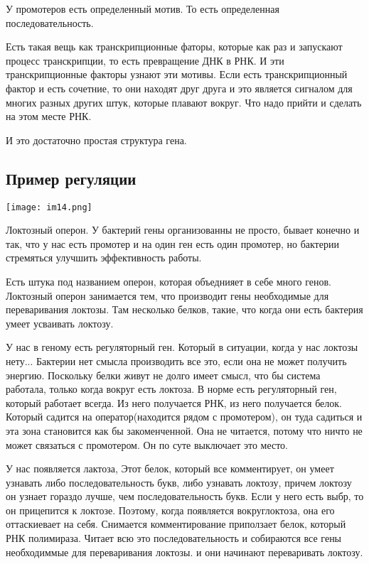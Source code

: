 У промотеров есть определенный мотив. То есть определенная последовательность. 

Есть такая вещь как транскрипционные фаторы, которые как раз и запускают 
процесс транскрипции, то есть превращение ДНК в РНК. И эти транскрипционные 
факторы узнают эти мотивы. Если есть транскрипционный фактор и
есть сочетние, то они находят друг друга и это является сигналом для многих
разных других штук,
которые плавают вокруг. Что надо прийти и сделать на этом месте РНК.

И это достаточно простая структура гена.  

\subsection{Пример регуляции}
\texttt{[image: im14.png]}

Локтозный оперон. У бактерий гены организованны не просто, 
бывает конечно и так, что у нас есть промотер и на один ген есть
один промотер, но бактерии стремяться улучшить эффективность работы.

Есть штука под названием оперон, которая объеднияет в себе много
генов. Локтозный оперон занимается тем, что производит гены необходимые
для переваривания локтозы. Там несколько белков,
такие, что когда они есть бактерия
умеет усваивать локтозу.

У нас в геному есть регуляторный ген. Который в ситуации, когда у нас
локтозы нету... Бактерии нет смысла производить все это, если
она не может получить энергию. Поскольку белки живут не долго
имеет смысл, что бы система работала, только
когда вокруг есть локтоза. В норме есть регуляторный ген,
который работает всегда. Из него получается
РНК, из него получается белок. Который садится на оператор(находится рядом с промотером),
он туда садиться и эта зона становится как бы закоменченной. Она
не читается, потому что ничто не может связаться с промотером. Он
по суте выключает это место.

У нас появляется лактоза, Этот белок, который все комментирует,
он умеет узнавать либо последовательность букв, либо узнавать локтозу,
причем локтозу он узнает гораздо лучше, чем последовательность букв.
Если у него есть выбр, то он прицепится к локтозе. Поэтому, когда
появляется вокруглоктоза, она его оттаскиевает на себя. Снимается комментирование
приползает белок, который РНК полимираза. Читает всю это последовательность и
собираются все гены необходиммые для переваривания локтозы. и они начинают переваривать локтозу.  
    
